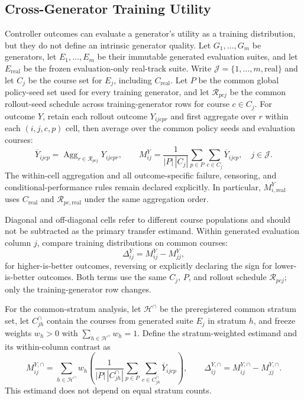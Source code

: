 \subsection{Cross-Generator Training Utility}

Controller outcomes can evaluate a generator's utility as a training distribution,
but they do not define an intrinsic generator quality. Let $G_1,\ldots,G_m$ be
generators, let $E_1,\ldots,E_m$ be their immutable generated evaluation suites, and
let $E_{\mathrm{real}}$ be the frozen evaluation-only real-track suite. Write
$\mathcal{J}=\{1,\ldots,m,\mathrm{real}\}$ and let $C_j$ be the course set for
$E_j$, including $C_{\mathrm{real}}$. Let $P$ be the common global policy-seed set
used for every training generator, and let $\mathcal{R}_{pcj}$ be the common
rollout-seed schedule across training-generator rows for course $c\in C_j$. For
outcome $Y$, retain each rollout outcome $Y_{ijcpr}$ and first aggregate over $r$
within each $(i,j,c,p)$ cell, then average over the common policy seeds and evaluation
courses:
\begin{equation}
  \overline{Y}_{ijcp}
  =\operatorname{Agg}_{r\in\mathcal{R}_{pcj}}Y_{ijcpr},
  \qquad
  M^Y_{ij}
  =\frac{1}{|P|\,|C_j|}
  \sum_{p\in P}\sum_{c\in C_j}\overline{Y}_{ijcp},
  \quad j\in\mathcal{J}.
\end{equation}
The within-cell aggregation and all outcome-specific failure, censoring, and
conditional-performance rules remain declared explicitly. In particular,
$M^Y_{i,\mathrm{real}}$ uses $C_{\mathrm{real}}$ and
$\mathcal{R}_{pc,\mathrm{real}}$ under the same aggregation order.

Diagonal and off-diagonal cells refer to different course populations and should not
be subtracted as the primary transfer estimand. Within generated evaluation column
$j$, compare training distributions on common courses:
\begin{equation}
  \Delta^Y_{ij}=M^Y_{ij}-M^Y_{jj},
  \label{eq:cross-generator-transfer-gap}
\end{equation}
for higher-is-better outcomes, reversing or explicitly declaring the sign for
lower-is-better outcomes. Both terms use the same $C_j$, $P$, and rollout schedule
$\mathcal{R}_{pcj}$; only the training-generator row changes.

For the common-stratum analysis, let $\mathcal{H}^{\cap}$ be the preregistered common
stratum set, let $C^{\cap}_{jh}$ contain the courses from generated suite $E_j$ in
stratum $h$, and freeze weights $w_h>0$ with
$\sum_{h\in\mathcal{H}^{\cap}}w_h=1$. Define the stratum-weighted estimand and its
within-column contrast as
\begin{equation}
  M^{Y,\cap}_{ij}
  =\sum_{h\in\mathcal{H}^{\cap}}w_h
  \left(
    \frac{1}{|P|\,|C^{\cap}_{jh}|}
    \sum_{p\in P}\sum_{c\in C^{\cap}_{jh}}\overline{Y}_{ijcp}
  \right),
  \qquad
  \Delta^{Y,\cap}_{ij}=M^{Y,\cap}_{ij}-M^{Y,\cap}_{jj}.
  \label{eq:common-stratum-transfer-gap}
\end{equation}
This estimand does not depend on equal stratum counts.

